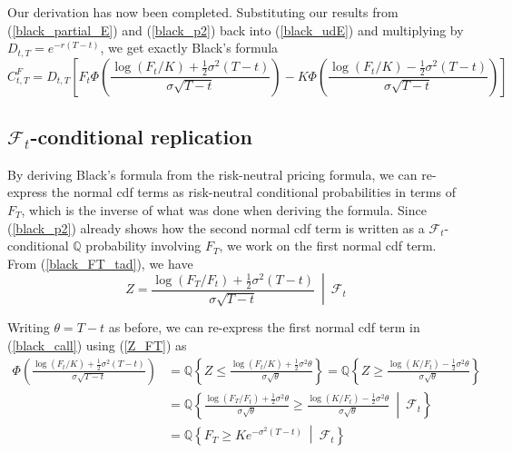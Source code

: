 \documentclass{article}
\numberwithin{equation}{section}
\begin{document}
Our derivation has now been completed. Substituting our results from
(\ref{black_partial_E}) and (\ref{black_p2}) back into (\ref{black_udE}) and
multiplying by $ D_{t, T} = e^{-r(T - t)}$, we get exactly Black's formula
\begin{equation} \label{black_call}
    C_{t, T}^F = D_{t, T}\left[F_t\Phi\left(\frac{\log(F_t / K) +
    \frac{1}{2}\sigma^2(T - t)}{\sigma\sqrt{T - t}}\right) -
    K\Phi\left(\frac{
        \log(F_t / K) - \frac{1}{2}\sigma^2(T - t)
    }{\sigma\sqrt{T - t}}\right)\right]
\end{equation}

\subsection{$ \mathcal{F}_t $-conditional replication}

By deriving Black's formula from the risk-neutral pricing formula, we can
re-express the normal cdf terms as risk-neutral conditional probabilities in
terms of $ F_T $, which is the inverse of what was done when deriving the
formula. Since (\ref{black_p2}) already shows how the second normal cdf term is
written as a $ \mathcal{F}_t$-conditional $ \mathbb{Q} $ probability involving
$ F_T $, we work on the first normal cdf term. From (\ref{black_FT_tad}), we
have
\begin{equation} \label{Z_FT}
    Z = \left.\frac{
        \log(F_T / F_t) + \frac{1}{2}\sigma^2(T - t)
    }{\sigma\sqrt{T - t}} \ \middle\vert \ \mathcal{F}_t\right.
\end{equation}

Writing $ \theta = T - t $ as before, we can re-express the first normal cdf
term in (\ref{black_call}) using (\ref{Z_FT}) as
\begin{equation} \label{black_q1}
    \begin{split}
        \Phi\left(\frac{
            \log(F_t / K) + \frac{1}{2}\sigma^2(T - t)
        }{\sigma\sqrt{T - t}}\right) & =
        \mathbb{Q}\left\{Z \le \frac{
            \log(F_t / K) + \frac{1}{2}\sigma^2\theta
        }{\sigma\sqrt{\theta}}\right\} =
        \mathbb{Q}\left\{Z \ge \frac{
            \log(K / F_t) - \frac{1}{2}\sigma^2\theta
        }{\sigma\sqrt{\theta}}\right\} \\ & =
        \mathbb{Q}\left\{\frac{
            \log(F_T / F_t) + \frac{1}{2}\sigma^2\theta
        }{\sigma\sqrt{\theta}} \ge \frac{
            \log(K / F_t) - \frac{1}{2}\sigma^2\theta
        }{\sigma\sqrt{\theta}} \ \middle\vert \ \mathcal{F}_t\right\} \\ & =
        \mathbb{Q}\left\{F_T \ge Ke^{-\sigma^2(T - t)} \ \middle\vert \ 
        \mathcal{F}_t\right\}
    \end{split}
\end{equation}
\end{document}
